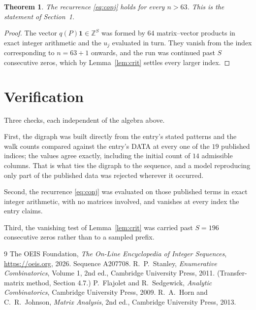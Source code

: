 \documentclass[11pt,a4paper]{article}
\theoremstyle{plain}
\newtheorem{theorem}{Theorem}
\theoremstyle{definition}
\begin{document}
\begin{theorem}
The recurrence \eqref{eq:conj} holds for every $n>63$. This is the statement of
Section~1.
\end{theorem}

\begin{proof}
The vector $q(P)\mathbf{1}\in\mathbb{Z}^{S}$ was formed by $64$ matrix--vector
products in exact integer arithmetic and the $u_j$ evaluated in turn. They vanish from the
index corresponding to $n=63+1$ onwards, and the run was continued past $S$ consecutive
zeros, which by Lemma~\ref{lem:crit} settles every larger index.
\end{proof}

\section{Verification}

Three checks, each independent of the algebra above.

First, the digraph was built directly from the entry's stated patterns and the walk counts
compared against the entry's DATA at every one of the $19$ published indices; the
values agree exactly, including the initial count of $14$ admissible columns. That is
what ties the digraph to the sequence, and a model reproducing only part of the published
data was rejected wherever it occurred.

Second, the recurrence \eqref{eq:conj} was evaluated on those published terms in exact
integer arithmetic, with no matrices involved, and vanishes at every index the entry claims.

Third, the vanishing test of Lemma~\ref{lem:crit} was carried past $S=196$ consecutive
zeros rather than to a sampled prefix.

\begin{thebibliography}{9}
 The OEIS Foundation, \emph{The On-Line Encyclopedia of Integer
Sequences}, \url{https://oeis.org}, 2026. Sequence A207708.
 R.~P.~Stanley, \emph{Enumerative Combinatorics}, Volume 1, 2nd ed.,
Cambridge University Press, 2011. (Transfer-matrix method, Section 4.7.)
 P.~Flajolet and R.~Sedgewick, \emph{Analytic Combinatorics}, Cambridge
University Press, 2009.
 R.~A.~Horn and C.~R.~Johnson, \emph{Matrix Analysis}, 2nd ed., Cambridge
University Press, 2013.
\end{thebibliography}
\end{document}
